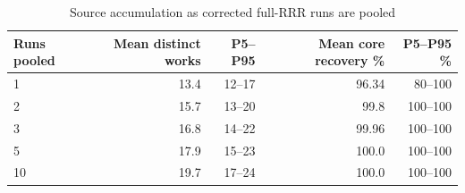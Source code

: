 \begin{table}[ht]
\centering
\caption{Source accumulation as corrected full-RRR runs are pooled}
\scriptsize
\begin{tabular}{lrrrr}
\toprule
Runs pooled & Mean distinct works & P5--P95 & Mean core recovery \% & P5--P95 \% \\
\midrule
1 & 13.4 & 12--17 & 96.34 & 80--100 \\
2 & 15.7 & 13--20 & 99.8 & 100--100 \\
3 & 16.8 & 14--22 & 99.96 & 100--100 \\
5 & 17.9 & 15--23 & 100.0 & 100--100 \\
10 & 19.7 & 17--24 & 100.0 & 100--100 \\
\bottomrule
\end{tabular}
\end{table}
